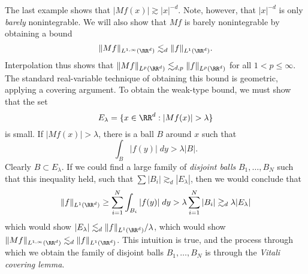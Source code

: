 The last example shows that $|Mf(x)| \gtrsim |x|^{-d}$. Note, however, that $|x|^{-d}$ is only \emph{barely} nonintegrable. We will also show that $Mf$ is barely nonintegrable by obtaining a bound
%
\[ \| Mf \|_{L^{1,\infty}(\RR^d)} \lesssim_d \| f \|_{L^1(\RR^d)}. \]
%
Interpolation thus shows that $\| Mf \|_{L^p(\RR^d)} \lesssim_{d,p} \| f \|_{L^p(\RR^d)}$ for all $1 < p \leq \infty$. The standard real-variable technique of obtaining this bound is geometric, applying a covering argument. To obtain the weak-type bound, we must show that the set
%
\[ E_\lambda = \{ x \in \RR^d : |Mf(x)| > \lambda \} \]
%
is small. If $|Mf(x)| > \lambda$, there is a ball $B$ around $x$ such that
%
\[ \int_B |f(y)|\; dy > \lambda |B|. \]
%
Clearly $B \subset E_\lambda$. If we could find a large family of \emph{disjoint balls} $B_1,\dots,B_N$ such that this inequality held, such that $\sum |B_i| \gtrsim_d |E_\lambda|$, then we would conclude that
%
\[ \| f \|_{L^1(\RR^d)} \geq \sum_{i = 1}^N \int_{B_i} |f(y)|\; dy > \lambda \sum_{i = 1}^N |B_i| \gtrsim_d \lambda |E_\lambda| \]
%
which would show $|E_\lambda| \lesssim_d \| f \|_{L^1(\RR^d)} / \lambda$, which would show $\| Mf \|_{L^{1,\infty}(\RR^d)} \lesssim_d \| f \|_{L^1(\RR^d)}$. This intuition is true, and the process through which we obtain the family of disjoint balls $B_1,\dots,B_N$ is through the \emph{Vitali covering lemma}.

